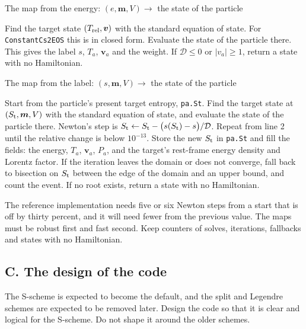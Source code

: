 \documentclass[11pt,aps,preprint,nofootinbib,superscriptaddress,tightenlines]{revtex4-2}
\begin{document}
\begin{algobox}{The map from the energy: $(e,\bm m,V)\to$ the state of the particle}
\begin{algorithmic}[1]
\State Find the target state $(T_{\rm rel},\bm v)$ with the standard equation of state.  For \texttt{ConstantCs2EOS} this is in closed form.
\State Evaluate the state of the particle there.  This gives the label $s$, $T_a$, $\bm v_a$ and the weight.
\State If $\mathcal D\le0$ or $|v_a|\ge1$, return a state with no Hamiltonian.
\end{algorithmic}
\end{algobox}

\begin{algobox}{The map from the label: $(s,\bm m,V)\to$ the state of the particle}
\begin{algorithmic}[1]
\State Start from the particle's present target entropy, \texttt{pa.St}.
\State Find the target state at $(S_{\rm t},\bm m,V)$ with the standard equation of state, and evaluate the state of the particle there.
\State Newton's step is $S_{\rm t}\leftarrow S_{\rm t}-\big(s(S_{\rm t})-s\big)/\mathcal D$.  Repeat from line 2 until the relative change is below $10^{-13}$.
\State Store the new $S_{\rm t}$ in \texttt{pa.St} and fill the fields: the energy, $T_a$, $\bm v_a$, $P_a$, and the target's rest-frame energy density
  and Lorentz factor.
\State If the iteration leaves the domain or does not converge, fall back to bisection on $S_{\rm t}$ between the edge of the domain and an upper
  bound, and count the event.  If no root exists, return a state with no Hamiltonian.
\end{algorithmic}
\end{algobox}

The reference implementation needs five or six Newton steps from a start that is off by thirty percent, and it will need fewer from the previous
value.  The maps must be robust first and fast second.  Keep counters of solves, iterations, fallbacks and states with no Hamiltonian.

\subsection{C. The design of the code}

The S-scheme is expected to become the default, and the split and Legendre schemes are expected to be removed later.  Design the code so that it is
clear and logical for the S-scheme.  Do not shape it around the older schemes.
\end{document}

